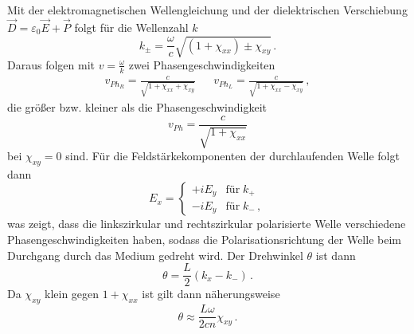 Mit der elektromagnetischen Wellengleichung und der dielektrischen Verschiebung $\vec{D} = \varepsilon_0 \vec{E} + \vec{P}$
folgt für die Wellenzahl $k$
\begin{equation*}
    k_{\pm} = \frac{\omega}{c} \sqrt{\left(1 + \chi_{xx} \right) \pm \chi_{xy}} \, .
\end{equation*}
Daraus folgen mit $v = \frac{\omega}{k}$ zwei Phasengeschwindigkeiten
\begin{align*}
    v_{Ph_R} = \frac{c}{\sqrt{1 + \chi_{xx} + \chi_{xy}}} && v_{Ph_L} = \frac{c}{\sqrt{1 + \chi_{xx} - \chi_{xy}}} \, ,
\end{align*}
die größer bzw. kleiner als die Phasengeschwindigkeit 
\begin{equation*}
    v_{Ph} = \frac{c}{\sqrt{1 + \chi_{xx}}}
\end{equation*}
bei $\chi_{xy} = 0$ sind. Für die Feldstärkekomponenten der durchlaufenden Welle folgt dann
\begin{equation*}
    E_x = \begin{cases}
        + i E_y & \text{für} \; k_{+} \\
        - i E_y & \text{für} \; k_{-} \, ,
    \end{cases}
\end{equation*}
was zeigt, dass die linkszirkular und rechtszirkular polarisierte Welle verschiedene Phasengeschwindigkeiten haben, 
sodass die Polarisationsrichtung der Welle beim Durchgang durch das Medium gedreht wird. Der Drehwinkel $\theta$ ist dann
\begin{equation*}
    \theta = \frac{L}{2} \left(k_{x} - k_{-}\right) \, .
\end{equation*}
Da $\chi_{xy}$ klein gegen $1 + \chi_{xx}$ ist gilt dann näherungsweise
\begin{equation*}
    \theta \approx \frac{L \omega}{2 c n} \chi_{xy} \, .
\end{equation*}
